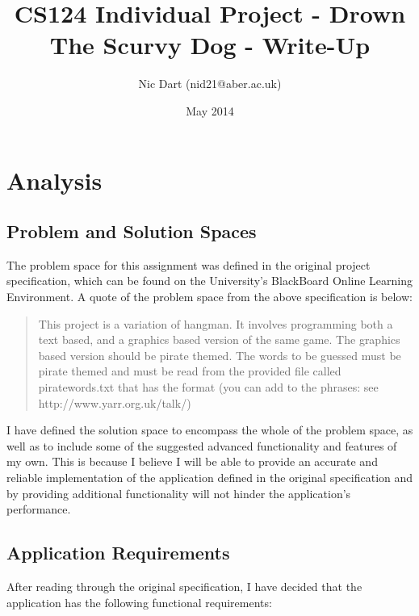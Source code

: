 \documentclass[a4paper, 11pt]{article}
\begin{document}
\title{CS124 Individual Project - Drown The Scurvy Dog - Write-Up}
\author{Nic Dart (nid21@aber.ac.uk)}
\date{May 2014}

\maketitle

\newpage

\tableofcontents

\newpage

\section{Analysis}

\subsection{Problem and Solution Spaces}

The problem space for this assignment was defined in the original project specification, which can be found on the University's BlackBoard Online Learning Environment. A quote of the problem space from the above specification is below:

\begin{quote}
This project is a variation of hangman. It involves programming both a text based, and a graphics based version of the same game. The graphics based version should be pirate themed. The words to be guessed must be pirate themed and must be read from the provided file called piratewords.txt that has the format (you can add to the phrases: see http://www.yarr.org.uk/talk/)
\end{quote}

I have defined the solution space to encompass the whole of the problem space, as well as to include some of the suggested advanced functionality and features of my own. This is because I believe I will be able to provide an accurate and reliable implementation of the application defined in the original specification and by providing additional functionality will not hinder the application's performance.

\subsection{Application Requirements}

After reading through the original specification, I have decided that the application has the following functional requirements:
\end{document}
